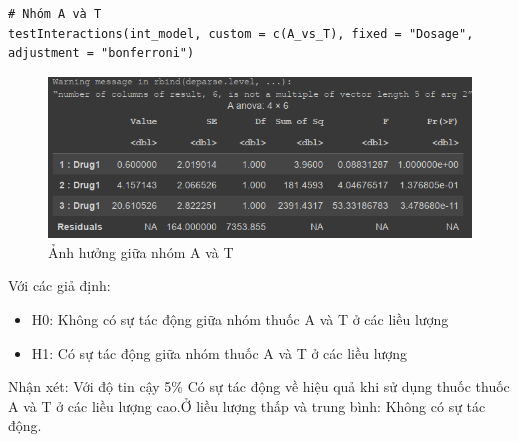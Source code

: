 \begin{itemize}
\begin{itemize}
    \begin{lstlisting}
# Nhóm A và T
testInteractions(int_model, custom = c(A_vs_T), fixed = "Dosage", adjustment = "bonferroni")
    \end{lstlisting}
    \begin{figure}[H]
        \centering
        \includegraphics[width=0.7\linewidth]{part01_figures/28.png}
        \caption{Ảnh hưởng giữa nhóm A và T}
        \label{fig:Ảnh hưởng giữa nhóm A và T}
    \end{figure}
    
    Với các giả định:
        \begin{itemize}
            \item H0: Không có sự tác động giữa nhóm thuốc A và T ở các liều lượng
            \item H1: Có sự tác động giữa nhóm thuốc A và T ở các liều lượng
        \end{itemize}
        Nhận xét: Với độ tin cậy 5\% Có sự tác động về hiệu quả khi sử dụng thuốc thuốc A và T ở các liều lượng cao.Ở liều lượng thấp và trung bình: Không có sự tác động.


\end{itemize}
\end{itemize}
